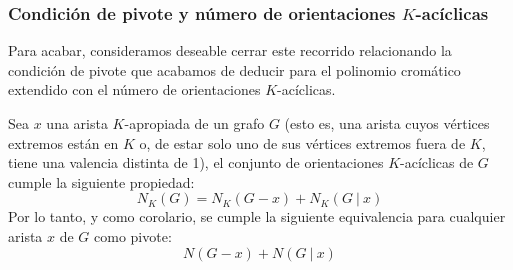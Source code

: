 \documentclass{article}
\numberwithin{figure}{section}
\begin{document}
\subsubsection{Condición de pivote y número de orientaciones $K$-acíclicas}
    Para acabar, consideramos deseable cerrar este recorrido relacionando la condición de pivote que acabamos de deducir para el polinomio cromático extendido con el número de orientaciones $K$-acíclicas.
    
    Sea $x$ una arista $K$-apropiada de un grafo $G$ (esto es, una arista cuyos vértices extremos están en $K$ o, de estar solo uno de sus vértices extremos fuera de $K$, tiene una valencia distinta de 1), el conjunto de orientaciones $K$-acíclicas de $G$ cumple la siguiente propiedad:
    \begin{equation*}
        N_K(G) = N_K(G - x) + N_K(G\ |\ x)
    \end{equation*}
    Por lo tanto, y como corolario, se cumple la siguiente equivalencia para cualquier arista $x$ de $G$ como pivote:
    \begin{equation*}
        N(G - x) + N(G\ |\ x)
    \end{equation*}
\end{document}
